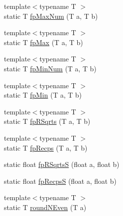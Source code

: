 \begin{DoxyCompactItemize}
{\footnotesize template$<$typename T $>$ }\\static T \hyperlink{namespaceArmISA_a359c10260d96388baa04be97176d0825}{fpMaxNum} (T a, T b)
\item 
{\footnotesize template$<$typename T $>$ }\\static T \hyperlink{namespaceArmISA_af47523076a7130f86062fb4b8c452399}{fpMax} (T a, T b)
\item 
{\footnotesize template$<$typename T $>$ }\\static T \hyperlink{namespaceArmISA_adc0d52cefffcbf5f5e0af3469baf3c1d}{fpMinNum} (T a, T b)
\item 
{\footnotesize template$<$typename T $>$ }\\static T \hyperlink{namespaceArmISA_a2dd245129701960816560cda7081c7c7}{fpMin} (T a, T b)
\item 
{\footnotesize template$<$typename T $>$ }\\static T \hyperlink{namespaceArmISA_a246364de2f51b991bc4f5ea894526eca}{fpRSqrts} (T a, T b)
\item 
{\footnotesize template$<$typename T $>$ }\\static T \hyperlink{namespaceArmISA_aa8d76e24c8658a4c2c26e00181b6b16a}{fpRecps} (T a, T b)
\item 
static float \hyperlink{namespaceArmISA_a94d34edffafa1fe4db6afca7ab02b69e}{fpRSqrtsS} (float a, float b)
\item 
static float \hyperlink{namespaceArmISA_a32b8b68ba6ed887428827a1d2516ec30}{fpRecpsS} (float a, float b)
\item 
{\footnotesize template$<$typename T $>$ }\\static T \hyperlink{namespaceArmISA_adb69d905177727cb68e6c1784571a288}{roundNEven} (T a)
\end{DoxyCompactItemize}
